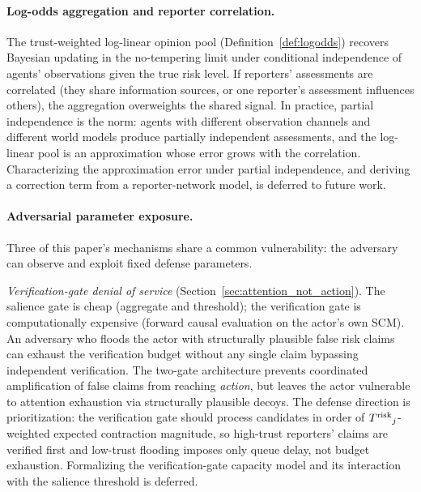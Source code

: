 \paragraph{Log-odds aggregation and reporter correlation.} The
trust-weighted log-linear opinion pool (Definition~\ref{def:logodds})
recovers Bayesian updating in the no-tempering limit under conditional
independence of agents' observations given the true risk level. If
reporters' assessments are correlated (they share information
sources, or one reporter's assessment influences others), the
aggregation overweights the shared signal. In practice, partial
independence is the norm: agents with different observation channels
and different world models produce partially independent assessments,
and the log-linear pool is an approximation whose error grows with
the correlation. Characterizing the approximation error under partial
independence, and deriving a correction term from a reporter-network
model, is deferred to future work.

\paragraph{Adversarial parameter exposure.} Three of this paper's
mechanisms share a common vulnerability: the adversary can observe
and exploit fixed defense parameters.

\emph{Verification-gate denial of service} (Section~\ref{sec:attention_not_action}).
The salience gate is cheap (aggregate and threshold); the
verification gate is computationally expensive (forward causal
evaluation on the actor's own SCM). An adversary who floods the
actor with structurally plausible false risk claims can exhaust the
verification budget without any single claim bypassing independent
verification. The two-gate architecture prevents coordinated
amplification of false claims from reaching \emph{action},
but leaves the actor vulnerable to attention exhaustion via
structurally plausible decoys. The defense direction is prioritization: the verification
gate should process candidates in order of ${T^{\mathrm{risk}}}_j$-weighted
expected contraction magnitude, so high-trust reporters' claims are
verified first and low-trust flooding imposes only queue delay, not
budget exhaustion. Formalizing the verification-gate capacity model
and its interaction with the salience threshold is deferred.

